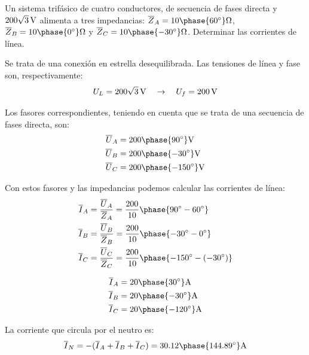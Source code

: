         \vspace{4mm}
        \begin{example}\label{ej.estrella-deseq}
          Un sistema trifásico de cuatro conductores, de secuencia de
          fases directa y
          $\SI[parse-numbers=false]{200\sqrt{3}}{\volt}$ alimenta a
          tres impedancias:
          $\overline{Z}_{A} = {10\phase{\ang{60}}}\unit{\ohm}$,
          $\overline{Z}_{B} = {10\phase{\ang{0}}}\unit{\ohm}$ y
          $\overline{Z}_{C} =
          {10\phase{\ang{-30}}}\unit{\ohm}$. Determinar las corrientes
          de línea.

          \vspace{1mm} \hspace*{-5mm}\hrulefill

          \vspace{4mm}
        
          Se trata de una conexión en estrella desequilibrada. Las
          tensiones de línea y fase son, respectivamente:
          \[ U_L = \SI[parse-numbers=false]{200\sqrt{3}}{\volt} \quad
            \rightarrow \quad U_f = \SI{200}{\volt}
          \]

          Los fasores correspondientes, teniendo en cuenta que se
          trata de una secuencia de fases directa, son:
          \begin{align*}
            \overline{U}_A &= {200\phase{\ang{90}}}\unit{\volt}\\
            \overline{U}_B &= {200\phase{\ang{-30}}}\unit{\volt}\\
            \overline{U}_C &= {200\phase{\ang{-150}}}\unit{\volt}\\
          \end{align*}

          Con estos fasores y las impedancias podemos calcular las
          corrientes de línea:
          \begin{align*}
            \overline{I}_A &= \frac{\overline{U}_A}{\overline{Z}_A} = \frac{200}{10}\phase{\ang{90} - \ang{60}} \\
            \overline{I}_B &= \frac{\overline{U}_B}{\overline{Z}_B} = \frac{200}{10}\phase{\ang{-30} - \ang{0}}\\
            \overline{I}_C &= \frac{\overline{U}_C}{\overline{Z}_C} = \frac{200}{10}\phase{\ang{-150} - (\ang{-30})}
          \end{align*}

 \begin{align*}
   \overline{I}_A &= {20\phase{\ang{30}}}\unit{\ampere}\\
   \overline{I}_B &= {20\phase{\ang{-30}}}\unit{\ampere}\\
   \overline{I}_C &= {20\phase{\ang{-120}}}\unit{\ampere}
 \end{align*}

 La corriente que circula por el neutro es:
 \[
   \overline{I}_N = -(\overline{I}_A + \overline{I}_B +
   \overline{I}_C) = {30.12\phase{\ang{144.89}}}\unit{\ampere}
 \]

\end{example}

